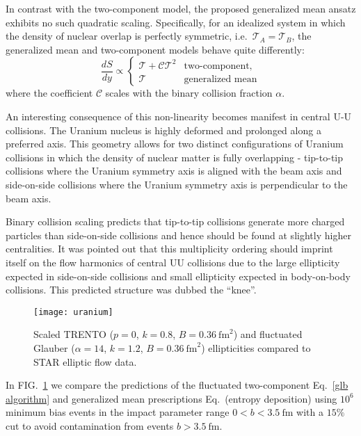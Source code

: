 \documentclass[aps,prl,reprint,amsmath,nofootinbib]{revtex4-1}
\begin{document}
In contrast with the two-component model, the proposed generalized mean ansatz exhibits no such quadratic
scaling. Specifically, for an idealized system in which the density of nuclear overlap is perfectly symmetric,
i.e.\ $\mathcal{T}_A = \mathcal{T}_B$, the generalized mean and two-component models behave quite differently:
\begin{equation}
  \label{symmetric scaling}
  \frac{dS}{dy} \propto
  \begin{cases}
    \mathcal{T} + \mathcal{C} \mathcal{T}^2 & \text{two-component,} \\
    \mathcal{T} & \text{generalized mean}
  \end{cases}
\end{equation}
where the coefficient $\mathcal{C}$ scales with the binary collision fraction $\alpha$.

An interesting consequence of this non-linearity becomes manifest in central U-U collisions. The Uranium
nucleus is highly deformed and prolonged along a preferred axis. This geometry allows for two distinct
configurations of Uranium collisions in which the density of nuclear matter is fully overlapping - tip-to-tip
collisions where the Uranium symmetry axis is aligned with the beam axis and side-on-side collisions where
the Uranium symmetry axis is perpendicular to the beam axis.

Binary collision scaling predicts that tip-to-tip collisions generate more charged particles than side-on-side
collisions and hence should be found at slightly higher centralities. It was pointed out that this
multiplicity ordering should imprint itself on the flow harmonics of central UU collisions due to the large
ellipticity expected in side-on-side collisions and small ellipticity expected in body-on-body collisions.
This predicted structure was dubbed the ``knee''.

\begin{figure}[t]
  \centering
  \texttt{[image: uranium]}
  \caption{\label{fig:knee}Scaled TRENTO ($p=0$, $k=0.8$, $B=0.36~\mathrm{fm}^2$) and fluctuated Glauber
  ($\alpha=14$, $k=1.2$, $B=0.36~\mathrm{fm}^2$) ellipticities compared to STAR elliptic flow data.}
\end{figure}

In FIG.~\ref{fig:knee} we compare the predictions of the fluctuated two-component Eq.~\eqref{glb algorithm}
and generalized mean prescriptions Eq.~(entropy deposition) using $10^6$ minimum bias events
in the impact parameter range $0<b<3.5 ~\mathrm{fm}$ with a $15\%$ cut to avoid contamination from events
$b>3.5 ~\mathrm{fm}$.
\end{document}
